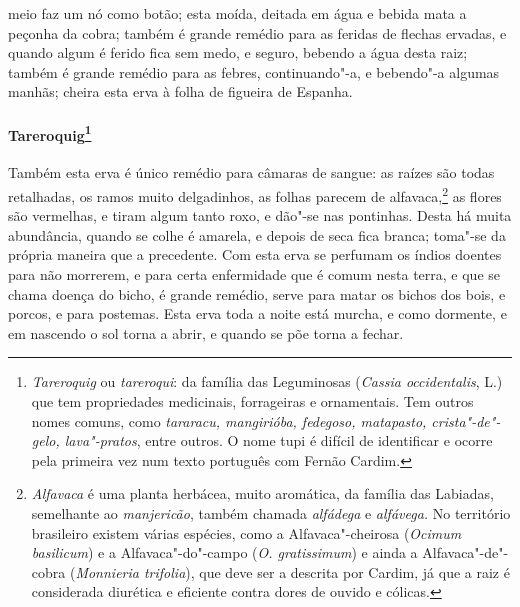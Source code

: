 meio faz um nó como botão; esta moída, deitada em água e bebida mata a
peçonha da cobra; também é grande remédio para as feridas de flechas
ervadas, e quando algum é ferido fica sem medo, e seguro, bebendo a
água desta raiz; também é grande remédio para as febres, continuando"-a,
e bebendo"-a algumas manhãs; cheira esta erva à folha de figueira de Espanha.

\paragraph{Tareroquig\footnote{ \textit{Tareroquig} ou \textit{tareroqui}: 
da família das Leguminosas (\textit{Cassia occidentalis}, L.) que
tem propriedades medicinais, forrageiras e ornamentais. Tem outros
nomes comuns, como \textit{tararacu, mangirióba, fedegoso, matapasto,
crista"-de"-gelo, lava"-pratos}, entre outros. O nome tupi é difícil de
identificar e ocorre pela primeira vez num texto português com Fernão
Cardim.}} Também esta erva é único remédio para câmaras de
sangue: as raízes são todas retalhadas, os ramos muito delgadinhos, as
folhas parecem de alfavaca,\footnote{ \textit{Alfavaca} é uma
planta herbácea, muito aromática, da família das Labiadas, semelhante
ao \textit{manjericão}, também chamada \textit{alfádega} e 
\textit{alfávega.} No território brasileiro existem várias
espécies, como a Alfavaca"-cheirosa (\textit{Ocimum basilicum}) 
e a Alfavaca"-do"-campo (\textit{O. gratissimum}) e ainda a
Alfavaca"-de"-cobra (\textit{Monnieria trifolia}), que deve ser a
descrita por Cardim, já que a raiz é considerada diurética e eficiente
contra dores de ouvido e cólicas.} as flores são vermelhas, e tiram
algum tanto roxo, e dão"-se nas pontinhas. Desta há muita abundância,
quando se colhe é amarela, e depois de seca fica branca; toma"-se da
própria maneira que a precedente. Com esta erva se perfumam os índios
doentes para não morrerem, e para certa enfermidade que é comum nesta
terra, e que se chama doença do bicho, é grande remédio, serve para
matar os bichos dos bois, e porcos, e para postemas. Esta erva toda a
noite está murcha, e como dormente, e em nascendo o sol torna a abrir,
e quando se põe torna a fechar.

